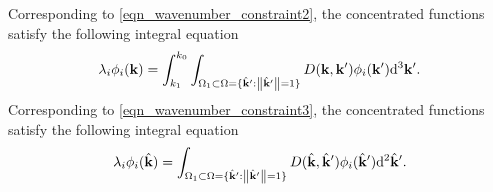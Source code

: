 \documentclass[12pt,draftclsnofoot,journal,onecolumn]{IEEEtran}
\begin{document}
Corresponding to \eqref{eqn_wavenumber_constraint2}, the concentrated functions satisfy the following integral equation
\begin{equation}
	\lambda_i \phi_i({\bf k}) = \int_{k_1}^{k_0}\int_{{\Omega}_1 \subset {\Omega}=\{\hat{\bf k}': \left\| \hat{\bf k}' \right\|=1\}} D({\bf k},{\bf k}')\phi_i({\bf k}'){\rm d}^3{\bf k}'.
\end{equation}
Corresponding to \eqref{eqn_wavenumber_constraint3}, the concentrated functions satisfy the following integral equation
\begin{equation}
	\lambda_i \phi_i(\hat{\bf k}) = \int_{{\Omega}_1 \subset {\Omega}=\{\hat{\bf k}': \left\| \hat{\bf k}' \right\|=1\}} D(\hat{\bf k},\hat{\bf k}')\phi_i(\hat{\bf k}'){\rm d}^2\hat{\bf k}'.
\end{equation}
	
%	
\end{document}
